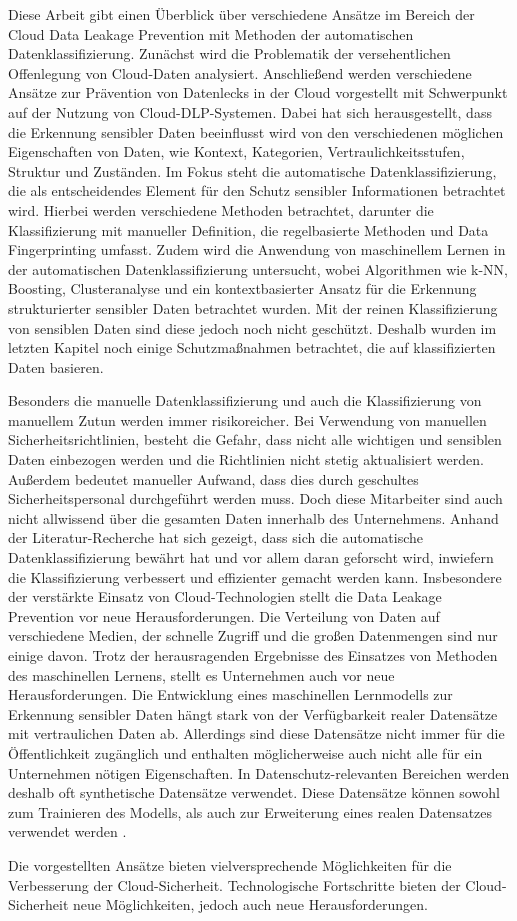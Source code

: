 Diese Arbeit gibt einen Überblick über verschiedene Ansätze im Bereich der Cloud Data Leakage Prevention mit Methoden der automatischen Datenklassifizierung. Zunächst wird die Problematik der versehentlichen Offenlegung von Cloud-Daten analysiert. Anschließend werden verschiedene Ansätze zur Prävention von Datenlecks in der Cloud vorgestellt mit Schwerpunkt auf der Nutzung von Cloud-DLP-Systemen. Dabei hat sich herausgestellt, dass die Erkennung sensibler Daten beeinflusst wird von den verschiedenen möglichen Eigenschaften von Daten, wie Kontext, Kategorien, Vertraulichkeitsstufen, Struktur und Zuständen. Im Fokus steht die automatische Datenklassifizierung, die als entscheidendes Element für den Schutz sensibler Informationen betrachtet wird. Hierbei werden verschiedene Methoden betrachtet, darunter die Klassifizierung mit manueller Definition, die regelbasierte Methoden und Data Fingerprinting umfasst. Zudem wird die Anwendung von maschinellem Lernen in der automatischen Datenklassifizierung untersucht, wobei Algorithmen wie k-NN, Boosting, Clusteranalyse und ein kontextbasierter Ansatz für die Erkennung strukturierter sensibler Daten betrachtet wurden. Mit der reinen Klassifizierung von sensiblen Daten sind diese jedoch noch nicht geschützt. Deshalb wurden im letzten Kapitel noch einige Schutzmaßnahmen betrachtet, die auf klassifizierten Daten basieren.

Besonders die manuelle Datenklassifizierung und auch die Klassifizierung von manuellem Zutun werden immer risikoreicher. Bei Verwendung von manuellen Sicherheitsrichtlinien, besteht die Gefahr, dass nicht alle wichtigen und sensiblen Daten einbezogen werden und die Richtlinien nicht stetig aktualisiert werden. Außerdem bedeutet manueller Aufwand, dass dies durch geschultes Sicherheitspersonal durchgeführt werden muss. Doch diese Mitarbeiter sind auch nicht allwissend über die gesamten Daten innerhalb des Unternehmens.
Anhand der Literatur-Recherche hat sich gezeigt, dass sich die automatische Datenklassifizierung bewährt hat und vor allem daran geforscht wird, inwiefern die Klassifizierung verbessert und effizienter gemacht werden kann. Insbesondere der verstärkte Einsatz von Cloud-Technologien stellt die Data Leakage Prevention vor neue Herausforderungen. Die Verteilung von Daten auf verschiedene Medien, der schnelle Zugriff und die großen Datenmengen sind nur einige davon. Trotz der herausragenden Ergebnisse des Einsatzes von Methoden des maschinellen Lernens, stellt es Unternehmen auch vor neue Herausforderungen. Die Entwicklung eines maschinellen Lernmodells zur Erkennung sensibler Daten hängt stark von der Verfügbarkeit realer Datensätze mit vertraulichen Daten ab. Allerdings sind diese Datensätze nicht immer für die Öffentlichkeit zugänglich und enthalten möglicherweise auch nicht alle für ein Unternehmen nötigen Eigenschaften. In Datenschutz-relevanten Bereichen werden deshalb oft synthetische Datensätze verwendet. Diese Datensätze können sowohl zum Trainieren des Modells, als auch zur Erweiterung eines realen Datensatzes verwendet werden \cite{Kuzina.2023}.

Die vorgestellten Ansätze bieten vielversprechende Möglichkeiten für die Verbesserung der Cloud-Sicherheit. Technologische Fortschritte bieten der Cloud-Sicherheit neue Möglichkeiten, jedoch auch neue Herausforderungen.